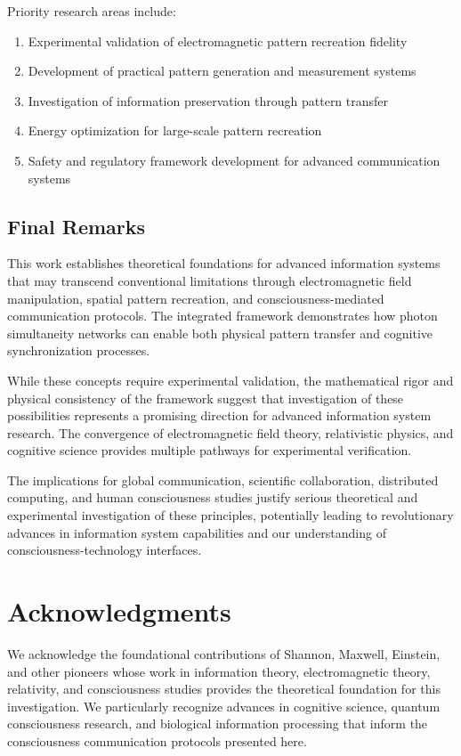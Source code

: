 \documentclass[12pt,a4paper]{article}
\begin{document}
Priority research areas include:

\begin{enumerate}
\item Experimental validation of electromagnetic pattern recreation fidelity
\item Development of practical pattern generation and measurement systems
\item Investigation of information preservation through pattern transfer
\item Energy optimization for large-scale pattern recreation
\item Safety and regulatory framework development for advanced communication systems
\end{enumerate}

\subsection{Final Remarks}

This work establishes theoretical foundations for advanced information systems that may transcend conventional limitations through electromagnetic field manipulation, spatial pattern recreation, and consciousness-mediated communication protocols. The integrated framework demonstrates how photon simultaneity networks can enable both physical pattern transfer and cognitive synchronization processes.

While these concepts require experimental validation, the mathematical rigor and physical consistency of the framework suggest that investigation of these possibilities represents a promising direction for advanced information system research. The convergence of electromagnetic field theory, relativistic physics, and cognitive science provides multiple pathways for experimental verification.

The implications for global communication, scientific collaboration, distributed computing, and human consciousness studies justify serious theoretical and experimental investigation of these principles, potentially leading to revolutionary advances in information system capabilities and our understanding of consciousness-technology interfaces.

\section*{Acknowledgments}

We acknowledge the foundational contributions of Shannon, Maxwell, Einstein, and other pioneers whose work in information theory, electromagnetic theory, relativity, and consciousness studies provides the theoretical foundation for this investigation. We particularly recognize advances in cognitive science, quantum consciousness research, and biological information processing that inform the consciousness communication protocols presented here.
\end{document}
